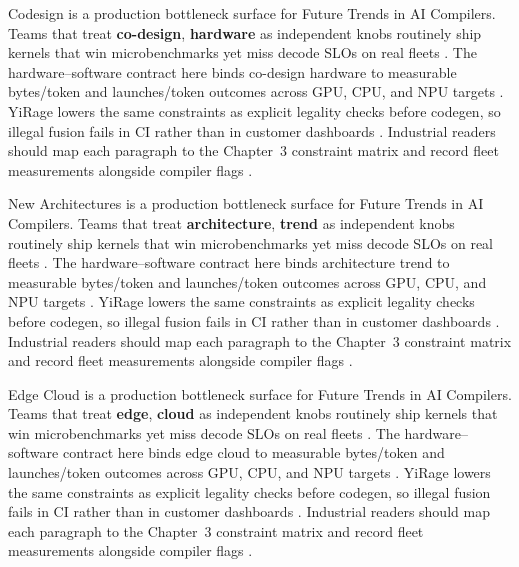 Codesign is a production bottleneck surface for Future Trends in AI Compilers. Teams that treat \textbf{co-design}, \textbf{hardware} as independent knobs routinely ship kernels that win microbenchmarks yet miss decode SLOs on real fleets \citep{dao2022flashattention,liu2024deepseekv3}. The hardware--software contract here binds co-design hardware to measurable bytes/token and launches/token outcomes across GPU, CPU, and NPU targets \citep{kwon2023vllm,patel2025llminference}. YiRage lowers the same constraints as explicit legality checks before codegen, so illegal fusion fails in CI rather than in customer dashboards \citep{nvidia2024cudagraphs,taxbreak2026}. Industrial readers should map each paragraph to the Chapter~3 constraint matrix and record fleet measurements alongside compiler flags \citep{liu2024deepseekv3,memoryfloor2026}.

New Architectures is a production bottleneck surface for Future Trends in AI Compilers. Teams that treat \textbf{architecture}, \textbf{trend} as independent knobs routinely ship kernels that win microbenchmarks yet miss decode SLOs on real fleets \citep{kwon2023vllm,patel2025llminference}. The hardware--software contract here binds architecture trend to measurable bytes/token and launches/token outcomes across GPU, CPU, and NPU targets \citep{nvidia2024cudagraphs,taxbreak2026}. YiRage lowers the same constraints as explicit legality checks before codegen, so illegal fusion fails in CI rather than in customer dashboards \citep{liu2024deepseekv3,memoryfloor2026}. Industrial readers should map each paragraph to the Chapter~3 constraint matrix and record fleet measurements alongside compiler flags \citep{patel2025llminference,nvidia2022hopper}.

Edge Cloud is a production bottleneck surface for Future Trends in AI Compilers. Teams that treat \textbf{edge}, \textbf{cloud} as independent knobs routinely ship kernels that win microbenchmarks yet miss decode SLOs on real fleets \citep{nvidia2024cudagraphs,taxbreak2026}. The hardware--software contract here binds edge cloud to measurable bytes/token and launches/token outcomes across GPU, CPU, and NPU targets \citep{liu2024deepseekv3,memoryfloor2026}. YiRage lowers the same constraints as explicit legality checks before codegen, so illegal fusion fails in CI rather than in customer dashboards \citep{patel2025llminference,nvidia2022hopper}. Industrial readers should map each paragraph to the Chapter~3 constraint matrix and record fleet measurements alongside compiler flags \citep{taxbreak2026,semianalysis2024tma}.

